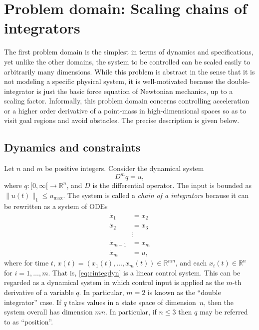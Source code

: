 \documentclass{amsart}
\theoremstyle{definition}
\begin{document}
\section{Problem domain: Scaling chains of integrators}\label{sec:scalingcinteg}

The first problem domain is the simplest in terms of dynamics and
specifications, yet unlike the other domains, the system to be controlled can be
scaled easily to arbitrarily many dimensions.  While this problem is abstract in
the sense that it is not modeling a specific physical system, it is
well-motivated because the double-integrator is just the basic force equation of
Newtonian mechanics, up to a scaling factor.  Informally, this problem domain
concerns controlling acceleration or a higher order derivative of a point-mass
in high-dimensional spaces so as to visit goal regions and avoid obstacles.  The
precise description is given below.

\subsection{Dynamics and constraints}

Let $n$ and $m$ be positive integers.  Consider the dynamical system
\begin{equation}\label{eq:minteg}
D^{m}q = u ,
\end{equation}
where $q: [0,\infty [ \rightarrow \mathbb{R}^{n}$, and $D$ is the differential
operator.  The input is bounded as $\lVert u(t) \rVert_1 \leq u_{\mathrm{max}}$.
The system is called a \textit{chain of a integrators} because it can be
rewritten as a system of ODEs
\begin{equation}\label{eq:cintegdyn}
\begin{split}
\dot{x}_1 &= x_2 \\
\dot{x}_2 &= x_3 \\
&\vdots \\
\dot{x}_{m-1} &= x_m \\
\dot{x}_m &= u ,
\end{split}
\end{equation}
where for time $t$, $x(t)=\left( x_{1}(t) , \ldots , x_{m}(t)\right)\in
\mathbb{R}^{nm}$, and each $x_{i}(t)\in \mathbb{R}^n$ for $i=1,\ldots,m$.  That
is, \eqref{eq:cintegdyn} is a linear control system.  This can be regarded as a
dynamical system in which control input is applied as the $m$-th derivative of a
variable $q$.  In particular, $m=2$ is known as the ``double integrator'' case.
If $q$ takes values in a state space of dimension~$n$, then the system overall
has dimension $mn$.  In particular, if $n \leq 3$ then $q$ may be referred to as
``position''.
\end{document}

